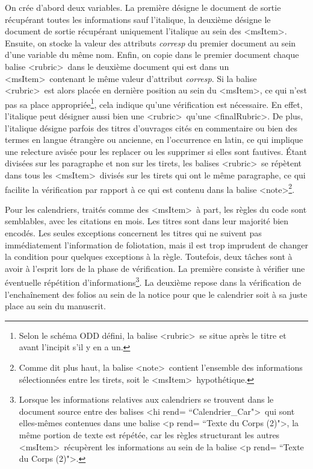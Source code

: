 \documentclass[a4paper,12pt,twoside]{book}
\begin{document}
On crée d'abord deux variables. La première désigne le document de sortie récupérant toutes les informations sauf l'italique, la deuxième désigne le document de sortie récupérant uniquement l'italique au sein des \textless msItem\textgreater . Ensuite, on stocke la valeur des attributs \textit{corresp} du premier document au sein d'une variable du même nom. Enfin, on copie dans le premier document chaque balise \textless rubric\textgreater~dans le deuxième document qui est dans un \textless msItem\textgreater~contenant le même valeur d'attribut \textit{corresp}. Si la balise \textless rubric\textgreater~est alors placée en dernière position au sein du \textless msItem\textgreater, ce qui n'est pas sa place appropriée\footnote{Selon le schéma ODD défini, la balise \textless rubric\textgreater~se situe après le titre et avant l'incipit s'il y en a un.}, cela indique qu'une vérification est nécessaire. En effet, l'italique peut désigner aussi bien une \textless rubric\textgreater~qu'une \textless finalRubric\textgreater. De plus, l'italique désigne parfois des titres d'ouvrages cités en commentaire ou bien des termes en langue étrangère ou ancienne, en l'occurrence en latin, ce qui implique une relecture avisée pour les replacer ou les supprimer si elles sont fautives. Étant divisées sur les paragraphe et non sur les tirets, les balises \textless rubric\textgreater~se répètent dans tous les \textless msItem\textgreater~divisés sur les tirets qui ont le même paragraphe, ce qui facilite la vérification par rapport à ce qui est contenu dans la balise \textless note\textgreater\footnote{Comme dit plus haut, la balise \textless note\textgreater~contient l'ensemble des informations sélectionnées entre les tirets, soit le \textless msItem\textgreater~hypothétique.}. 

Pour les calendriers, traités comme des \textless msItem\textgreater~à part, les règles du code sont semblables, avec les citations en mois. Les titres sont dans leur majorité bien encodés. Les seules exceptions concernent les titres qui ne suivent pas immédiatement l'information de foliotation, mais il est trop imprudent de changer la condition pour quelques exceptions à la règle. Toutefois, deux tâches sont à avoir à l'esprit lors de la phase de vérification. La première consiste à vérifier une éventuelle répétition d'informations\footnote{Lorsque les informations relatives aux calendriers se trouvent dans le document source entre des balises \textless hi rend= ``Calendrier\_Car"\textgreater~qui sont elles-mêmes contenues dans une balise \textless p rend= ``Texte du Corps (2)"\textgreater, la même portion de texte est répétée, car les règles structurant les autres \textless msItem\textgreater~récupèrent les informations au sein de la balise \textless p rend= ``Texte du Corps (2)"\textgreater .}. La deuxième repose dans la vérification de l'enchaînement des folios au sein de la notice pour que le calendrier soit à sa juste place au sein du manuscrit.
\end{document}
